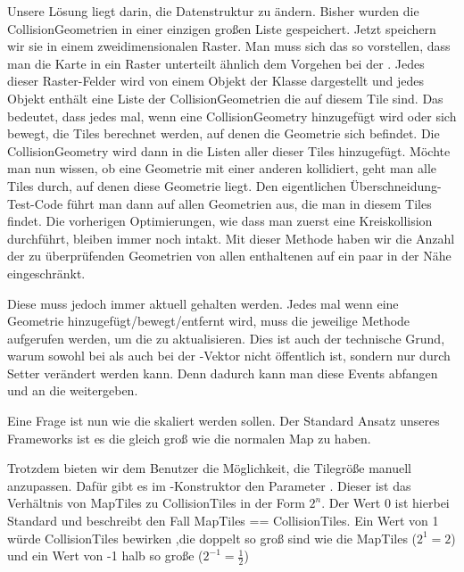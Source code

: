 Unsere Lösung liegt darin, die Datenstruktur zu ändern. Bisher wurden die CollisionGeometrien in einer einzigen großen Liste gespeichert. Jetzt speichern wir sie in einem zweidimensionalen Raster.
Man muss sich das so vorstellen, dass man die Karte in ein Raster unterteilt ähnlich dem Vorgehen bei der . Jedes dieser Raster-Felder wird von einem Objekt der Klasse  dargestellt und jedes Objekt enthält eine Liste der CollisionGeometrien die auf diesem Tile sind.
Das bedeutet, dass jedes mal, wenn eine CollisionGeometry hinzugefügt wird oder sich bewegt, die Tiles berechnet werden, auf denen die Geometrie sich befindet. Die CollisionGeometry wird dann in die Listen aller dieser Tiles hinzugefügt. Möchte man nun wissen, ob eine Geometrie mit einer anderen kollidiert, geht man alle Tiles durch, auf denen diese Geometrie liegt. Den eigentlichen Überschneidung-Test-Code führt man dann auf allen Geometrien aus, die man in diesem Tiles findet. Die vorherigen Optimierungen, wie dass man zuerst eine Kreiskollision durchführt, bleiben immer noch intakt. Mit dieser Methode haben wir die Anzahl der zu überprüfenden Geometrien von allen enthaltenen auf ein paar in der Nähe eingeschränkt.

Diese  muss jedoch immer aktuell gehalten werden. Jedes mal wenn eine Geometrie hinzugefügt/bewegt/entfernt wird, muss die jeweilige Methode aufgerufen werden, um die  zu aktualisieren. Dies ist auch der technische Grund, warum sowohl bei  als auch bei  der -Vektor nicht öffentlich ist, sondern nur durch Setter verändert werden kann. Denn dadurch kann man diese Events abfangen und an die  weitergeben.

Eine Frage ist nun wie die  skaliert werden sollen. Der Standard Ansatz unseres Frameworks ist es die  gleich groß wie die normalen Map  zu haben.

Trotzdem bieten wir dem Benutzer die Möglichkeit, die Tilegröße manuell anzupassen.
Dafür gibt es im -Konstruktor den Parameter .
Dieser ist das Verhältnis von MapTiles zu CollisionTiles in der Form $ 2^n $.
Der Wert 0 ist hierbei Standard und beschreibt den Fall MapTiles == CollisionTiles.
Ein Wert von 1 würde CollisionTiles bewirken ,die doppelt so groß sind wie die MapTiles ($2^1 = 2$) und ein Wert von -1 halb so große ($2^{-1} = \frac{1}{2}$)

